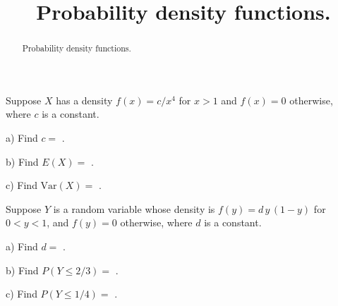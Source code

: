 \documentclass{ximera}
\title{Probability density functions.}
\begin{document}
\begin{abstract}
Probability density functions.
\end{abstract}
\maketitle

Suppose $X$ has a density $f(x)=c/x^{4}$ for $x>1$ and $f(x)=0$ otherwise, where $c$ is a constant.

\begin{question} 
     \begin{solution}
          a) Find $c = $  .
     \end{solution}
\end{question}

\begin{question}
     \begin{solution}
          b) Find $E(X) = $  .
     \end{solution}
\end{question}

\begin{question}
     \begin{solution}
          c) Find $\text{Var}(X) = $  .
     \end{solution}
\end{question}

Suppose $Y$ is a random variable whose density is $f(y)=d\,y\,(1-y)$ for $0 < y < 1$, and $f(y)=0$ otherwise, where $d$ is a constant.

\begin{question} 
     \begin{solution}
          a) Find $d = $  .
     \end{solution}
\end{question}

\begin{question}
     \begin{solution}
          b) Find $P(Y \leq 2/3) = $  .
     \end{solution}
\end{question}

\begin{question}
     \begin{solution}
          c) Find $P(Y\leq 1/4 ) = $  .
     \end{solution}
\end{question}
\end{document}
